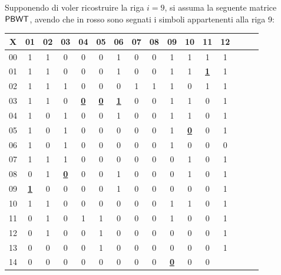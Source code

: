 \begin{esempio}
   Supponendo di voler ricostruire la riga $i=9$, si assuma la seguente matrice
   $\mbox{\rm {\sf PBWT}}$, avendo che in rosso sono segnati i simboli appartenenti alla riga 9: 
  \begin{table}[H]
    \centering
    \footnotesize
    \begin{tabular}{c|ccccccccccccccc}
      X & 01 & 02 & 03 & 04 & 05 & 06 & 07 & 08 & 09 & 10 & 11 & 12 \\
      \hline
      00 & 1 & 1 & 0 & 0 & 0 & 1 & 0 & 0 & 1 & 1 & 1 & 1 \\
      01 & 1 & 1 & 0 & 0 & 0 & 1 & 0 & 0 & 1 & 1 & {\color{nordred}\textbf{\underline{1}}}
                                                               & 1 \\
      02 & 1 & 1 & 1 & 0 & 0 & 0 & 1 & 1 & 1 & 0 & 1 & 1 \\
      03 & 1 & 1 & 0 & {\color{nordred}\textbf{\underline{0}}} & {\color{nordred}\textbf{\underline{0}}}
                                 & {\color{nordred}\textbf{\underline{1}}} & 0 & 0 & 1 & 1
                                                          & 0 & 1 \\
      04 & 1 & 0 & 1 & 0 & 0 & 1 & 0 & 0 & 1 & 1 & 0 & 1 \\
      05 & 1 & 0 & 1 & 0 & 0 & 0 & 0 & 0 & 1 & {\color{nordred}\textbf{\underline{0}}} & 0
                                                               & 1 \\
      06 & 1 & 0 & 1 & 0 & 0 & 0 & 0 & 0 & 1 & 0 & 0 & 0 \\
      07 & 1 & 1 & 1 & 0 & 0 & 0 & 0 & 0 & 0 & 1 & 0 & 1 \\
      08 & 0 & 1 & {\color{nordred}\textbf{\underline{0}}} & 0 & 0 & 1 & 0 & 0 & 0 & 1 & 0
                                                               & 1 \\
      09 & {\color{nordred}\textbf{\underline{1}}} & 0 & 0 & 0 & 0 & 1 & 0 & 0 & 0 & 0 & 0
                                                               & 1 \\
      10 & 1 & 1 & 0 & 0 & 0 & 0 & 0 & 0 & 1 & 1 & 0 & 1 \\
      11 & 0 & 1 & 0 & 1 & 1 & 0 & 0 & 0 & 1 & 0 & 0 & 1 \\
      12 & 0 & 1 & 0 & 0 & 1 & 0 & 0 & 0 & 0 & 0 & 0 & 1 \\
      13 & 0 & 0 & 0 & 0 & 1 & 0 & 0 & 0 & 0 & 0 & 0 & 1 \\
      14 & 0 & 0 & 0 & 0 & 0 & 0 & 0 & 0 & {\color{nordred}\textbf{\underline{0}}} & 0 & 0

\end{tabular}
\end{table}
\end{esempio}

